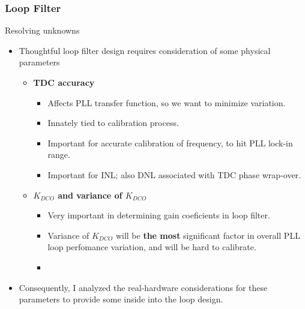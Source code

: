 \documentclass[t, screen, aspectratio=43]{beamer}
\begin{document}
\begin{frame}
	\frametitle{Loop Filter}
	\begin{block}{Resolving unknowns}
		\begin{itemize}
			\footnotesize
			\item Thoughtful loop filter design requires consideration of some physical parameters
			\begin{itemize}
				\scriptsize
				\item\textbf{TDC accuracy}
				\begin{itemize}
					\scriptsize
					\item Affects PLL transfer function, so we want to minimize variation.
					\item Innately tied to calibration process.
					\item Important for accurate calibration of frequency, to hit PLL lock-in range.
					\item Important for INL; also DNL associated with TDC phase wrap-over.
				\end{itemize}
				\item \textbf{$K_{DCO}$ and variance of $K_{DCO}$}
				\begin{itemize}
					\scriptsize
					\item Very important in determining gain coeficients in loop filter.
					\item Variance of $K_{DCO}$ will be \textbf{the most} significant factor in overall PLL loop perfomance variation, and will be hard to calibrate.
					\item 
				\end{itemize}
			\end{itemize}
			\item Consequently, I analyzed the real-hardware considerations for these parameters to provide some inside into the loop design. 
		\end{itemize} 	
	\end{block}
\end{frame}
\end{document}
